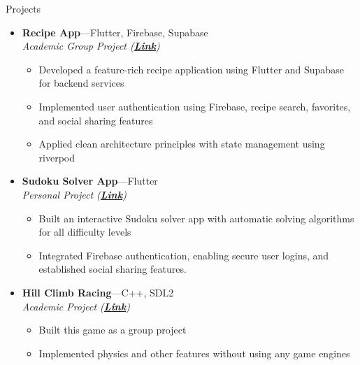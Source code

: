 \documentclass[10pt,oneside]{article}
\newenvironment{ressection}[1]{
  \vspace{4pt}
  {\fontfamily{phv}\selectfont\Large#1}
  \begin{itemize}
  \vspace{3pt}
}{
  \end{itemize}
}
\newcommand{\ressubitem}[1]{
  \vspace{-1pt}
  \item \begin{flushleft} #1 \end{flushleft}
}
\newcommand{\resbigitem}[3]{
  \vspace{-5pt}
  \item
  \textbf{#1}---#2 \\
  \textit{#3}
}
\newenvironment{ressubsec}[3]{
  \resbigitem{#1}{#2}{#3}
  \vspace{-2pt}
  \begin{itemize}
}{
  \end{itemize}
}
\begin{document}
\begin{ressection}{Projects}


    \begin{ressubsec}{Recipe App}{Flutter, Firebase, Supabase}{Academic Group Project (\textbf{\href{https://github.com/ninadgns/Android-Project-Pink-Flag}{Link}})}
        \ressubitem{Developed a feature-rich recipe application using Flutter and Supabase for backend services}
        \ressubitem{Implemented user authentication using Firebase, recipe search, favorites, and social sharing features}
        \ressubitem{Applied clean architecture principles with state management using riverpod}
    \end{ressubsec}
    
    \begin{ressubsec}{Sudoku Solver App}{Flutter}{Personal Project (\textbf{\href{https://github.com/mithunvoe/sudoku_solver}{Link}})}
        \ressubitem{Built an interactive Sudoku solver app with automatic solving algorithms for all difficulty levels}
        \ressubitem{Integrated Firebase authentication, enabling secure user logins, and established social sharing features.}
    \end{ressubsec}
    
    \begin{ressubsec}{Hill Climb Racing}{C++, SDL2}{Academic Project (\textbf{\href{https://github.com/mithunvoe/Hill-Climb-Racing}{Link}})}
        \ressubitem{Built this game as a group project}
        \ressubitem{Implemented physics and other features without using any game engines}
    \end{ressubsec}

\end{ressection}
\end{document}

